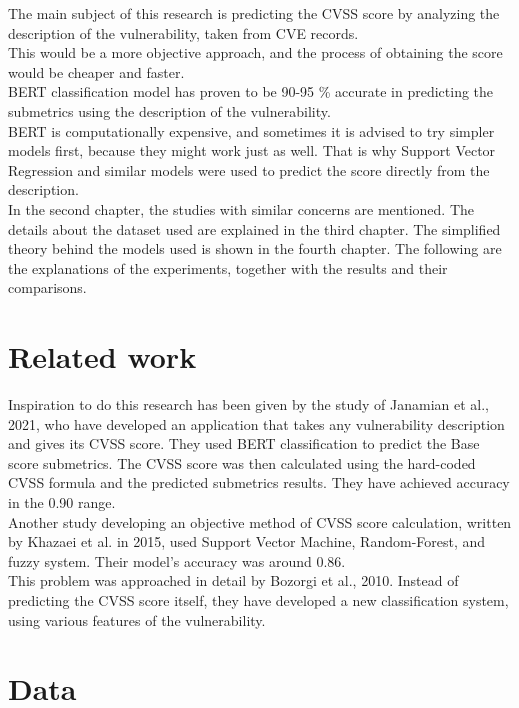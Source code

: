 \documentclass[times, utf8, zavrsni, english]{fer}
\begin{document}
\noindent The main subject of this research is predicting the CVSS score by analyzing the description of the vulnerability, taken from CVE records. \\
This would be a more objective approach, and the process of obtaining the score would be cheaper and faster. \\
BERT classification model has proven to be 90-95 \% accurate in predicting the submetrics using the description of the vulnerability. \\
BERT is computationally expensive, and sometimes it is advised to try simpler models first, because they might work just as well. That is why Support Vector Regression and similar models were used to predict the score directly from the description.\\

\noindent In the second chapter, the studies with similar concerns are mentioned. The details about the dataset used are explained in the third chapter. The simplified theory behind the models used is shown in the fourth chapter. The following are the explanations of the experiments, together with the results and their comparisons. 

\chapter{Related work}
Inspiration to do this research has been given by the study of Janamian et al., 2021, who have developed an application that takes any vulnerability description and gives its CVSS score. They used BERT classification to predict the Base score submetrics. The CVSS score was then calculated using the hard-coded CVSS formula and the predicted submetrics results. They have achieved accuracy in the 0.90 range. \\

\noindent Another study developing an objective method of CVSS score calculation, written by Khazaei et al. in 2015, used Support Vector Machine, Random-Forest, and fuzzy system. Their model's accuracy was around 0.86. \\

\noindent This problem was approached in detail by Bozorgi et al., 2010.  Instead of predicting the CVSS score itself, they have developed a new classification system, using various features of the vulnerability. \\

\chapter{Data}
\end{document}
